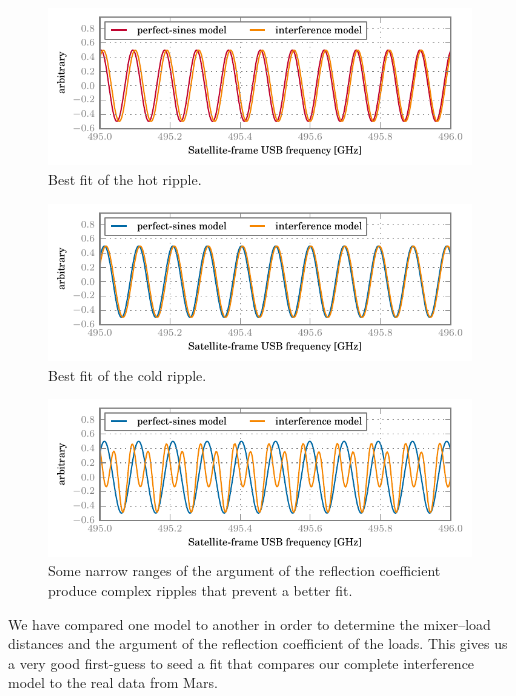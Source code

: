 \begin{figure}
    \centering
    \includegraphics{mars_25_interf_distance_fit_hot}
    \caption{Best fit of the hot ripple.}
    \label{fig:mars_25_interf_distance_fit_hot}
\end{figure}
\begin{figure}
    \centering
    \includegraphics{mars_25_interf_distance_fit_cold}
    \caption{Best fit of the cold ripple.}
    \label{fig:mars_25_interf_distance_fit_cold}
\end{figure}
\begin{figure}
    \centering
    \includegraphics{mars_25_interf_distance_fit_cold_poor}
    \caption{Some narrow ranges of the argument of the reflection coefficient produce complex ripples that prevent a better fit.}
    \label{fig:mars_25_interf_distance_fit_cold_poor}
\end{figure}

We have compared one model to another in order to determine the mixer--load distances
and the argument of the reflection coefficient of the loads.
This gives us a very good first-guess to seed a fit that compares our complete interference model to the real data from Mars.





